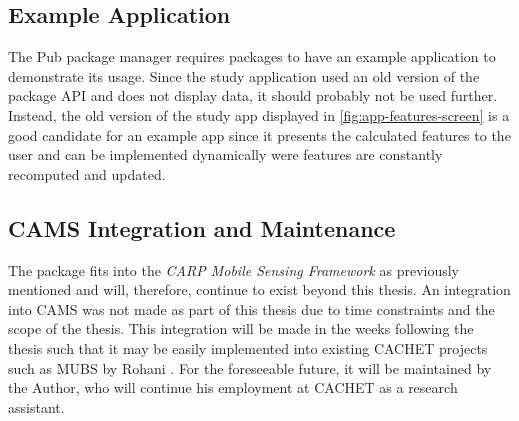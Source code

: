 \subsection{Example Application}
The Pub package manager requires packages to have an example application to demonstrate its usage. Since the study application used an old version of the package API and does not display data, it should probably not be used further. Instead, the old version of the study app displayed in \ref{fig:app-features-screen} is a good candidate for an example app since it presents the calculated features to the user and can be implemented dynamically were features are constantly recomputed and updated.

\subsection{CAMS Integration and Maintenance}
The package fits into the \textit{CARP Mobile Sensing Framework} as previously mentioned and will, therefore, continue to exist beyond this thesis. An integration into CAMS was not made as part of this thesis due to time constraints and the scope of the thesis. This integration will be made in the weeks following the thesis such that it may be easily implemented into existing CACHET projects such as MUBS by Rohani \cite{mubs-rohani}. For the foreseeable future, it will be maintained by the Author, who will continue his employment at CACHET as a research assistant. 